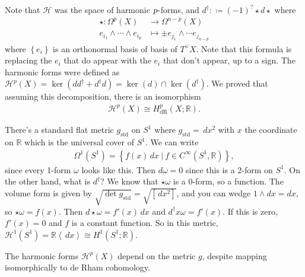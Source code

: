 \begin{remark}

Note that \(\mathcal{H}\) was the space of harmonic
\(p{\hbox{-}}\)forms, and \(d^\dagger: \coloneqq(-1)^? \star d\star\)
where
\begin{align*}
\star: \Omega^{p}(X) &\to \Omega^{n-p}(X) \\
e_{i_1} \wedge \cdots \wedge e_{i_p} 
&\mapsto 
\pm e_{j_1} \wedge \cdots e_{j_{n-p}}
\end{align*}
where \(\left\{{ e_i}\right\}\) is an orthonormal basis of basis of
\(T^\vee X\). Note that this formula is replacing the \(e_i\) that do
appear with the \(e_i\) that don't appear, up to a sign. The harmonic
forms were defined as
\({\mathcal{H}}^p(X) = \ker (dd^\dagger + d^\dagger d ) = \ker (d) \cap\ker(d^\dagger)\).
We proved that assuming this decomposition, there is an isomorphism
\begin{align*}
{\mathcal{H}}^p(X) \cong H^p_{\mathrm{dR}}(X; {\mathbb{R}})
.\end{align*}

\end{remark}

\begin{example}

There's a standard flat metric \(g_\text{std}\) on \(S^1\) where
\(g_\text{std}= \,dx^2\) with \(x\) the coordinate on \({\mathbb{R}}\)
which is the universal cover of \(S^1\). We can write
\begin{align*} 
\Omega^1(S^1) = \left\{{ f(x)\,dx{~\mathrel{\Big|}~}f \in C^{\infty }(S^1, {\mathbb{R}}) }\right\} 
,\end{align*}
since every 1-form \(\omega\) looks like this. Then \(d \omega = 0\)
since this is a 2-form on \(S^1\). On the other hand, what is
\(d^\dagger\)? We know that \(\star\omega\) is a 0-form, so a function.
The volume form is given by
\(\sqrt{ \det g_\text{std}} = \sqrt{ [\,dx^2 ] }\), and you can wedge
\(1\wedge dx = dx\), so \(\star\omega = f(x)\). Then
\(d \star\omega = f'(x) \,dx\) and \(d^\dagger x \omega = f'(x)\). If
this is zero, \(f'(x) = 0\) and \(f\) is a constant function. So in this
metric,
\({\mathcal{H}}^1(S^1) = {\mathbb{R}}\left\langle{ \,dx}\right\rangle \cong H^1(S^1; {\mathbb{R}})\).

\end{example}

\begin{remark}[Important]

The harmonic forms \({\mathcal{H}}^p(X)\) depend on the metric \(g\),
despite mapping isomorphically to de Rham cohomology.

\end{remark}

